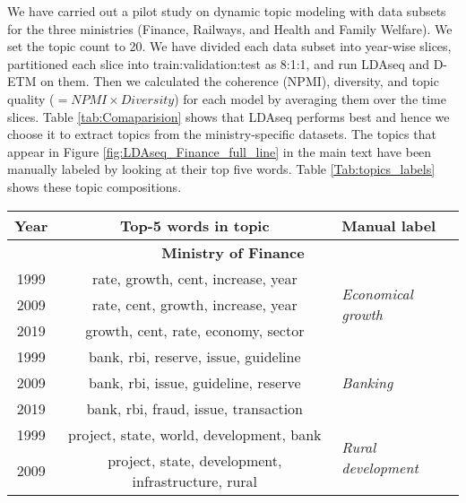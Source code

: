 \documentclass[10pt, a4paper]{article}
\begin{document}
 We have carried out a pilot study on dynamic topic modeling with data subsets for the three ministries (Finance, Railways, and Health and Family Welfare). We set the topic count to 20.  
 We have divided each data subset into year-wise slices, partitioned each slice into train:validation:test as 8:1:1, and run LDAseq and D-ETM on them. Then we calculated the coherence (NPMI),  diversity, and topic quality ($= NPMI \times Diversity$) for each model by averaging them over the time slices. Table \ref{tab:Comaparision} shows that LDAseq performs best and hence we choose it to extract topics from the ministry-specific datasets. 
The topics that appear in Figure   \ref{fig:LDAseq_Finance_full_line} in the main text have been  manually labeled by looking at their top five words. Table  \ref{Tab:topics_labels} shows these topic compositions.
 \begin{table}[!htbp]
\centering
\begin{adjustbox}{width=1\linewidth}
  \begin{tabular}{|c|c|l|} \hline 
        \textbf{Year} & \textbf{Top-5 words in topic} & \textbf{Manual label} \\ \hline
        \multicolumn{3}{|c|}{\textbf{Ministry of Finance}} \\ \hline
        1999 & rate, growth, cent, increase, year & \multirow{3}{2cm}{\textit{Economical growth}} \\ \cline{1-2}
        
        2009 & rate, cent, growth, increase, year &\\ \cline{1-2}
        
        2019 & growth, cent, rate, economy, sector & \\ \hline \hline
        
        1999 & bank, rbi, reserve, issue, guideline & \multirow{3}{2cm}{\textit{Banking}} \\ \cline{1-2}
        
        2009 & bank, rbi, issue, guideline, reserve &\\ \cline{1-2}
        
        2019 & bank, rbi, fraud, issue, transaction & \\ \hline \hline
        
        1999 & project, state, world, development, bank & \multirow{3}{2cm}{\textit{Rural development}} \\ \cline{1-2}
        
        2009 & project, state, development, infrastructure, rural & \\ \cline{1-2}
        

\end{tabular}
\end{adjustbox}
\end{table}
\end{document}
